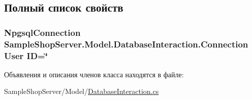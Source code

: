 \subsection{Полный список свойств}
\hypertarget{class_sample_shop_server_1_1_model_1_1_database_interaction_a1d4f03db76711dec47dd9c51adee1f66}{}
\subsubsection[{Connection}]{\setlength{\rightskip}{0pt plus 5cm}Npgsql\+Connection Sample\+Shop\+Server.\+Model.\+Database\+Interaction.\+Connection User I\+D=\char`\"{}\hspace{0.3cm}{\ttfamily [get]}}\label{class_sample_shop_server_1_1_model_1_1_database_interaction_a1d4f03db76711dec47dd9c51adee1f66}


Объявления и описания членов класса находятся в файле\+:\begin{DoxyCompactItemize}
\item 
Sample\+Shop\+Server/\+Model/\hyperlink{_database_interaction_8cs}{Database\+Interaction.\+cs}\end{DoxyCompactItemize}
